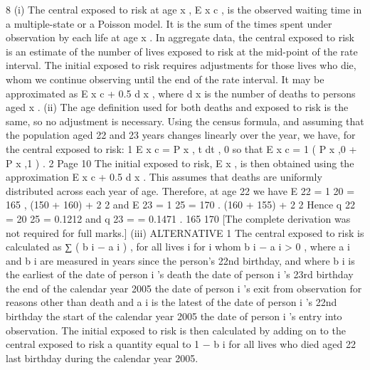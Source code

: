 \documentclass[a4paper,12pt]{article}
\begin{document}
\begin{enumerate}
8
(i)
The central exposed to risk at age x , E x c , is the observed waiting time in a multiple-state or a Poisson model. It is the sum of the times spent under
observation by each life at age x .
In aggregate data, the central exposed to risk is an estimate of the number of lives exposed to risk at the mid-point of the rate interval.
The initial exposed to risk requires adjustments for those lives who die, whom we continue observing until the end of the rate interval.
It may be approximated as E x c + 0.5 d x , where d x is the number of deaths to persons aged x .
(ii)
The age definition used for both deaths and exposed to risk is the same, so no adjustment is necessary.
Using the census formula, and assuming that the population aged 22 and 23 years changes linearly over the year, we have, for the central exposed to risk:
1
E x c = \int P x , t dt ,
0
so that
E x c =
1
( P x ,0 + P x ,1 ) .
2
Page 10%
The initial exposed to risk, E x , is then obtained using the approximation
E x c + 0.5 d x .
This assumes that deaths are uniformly distributed across each year of age.
Therefore, at age 22 we have
E 22 =
1
20
= 165 ,
(150 + 160) +
2
2
and
E 23 =
1
25
= 170 .
(160 + 155) +
2
2
Hence q 22 =
20
25
= 0.1212 and q 23 =
= 0.1471 .
165
170
[The complete derivation was not required for full marks.]
(iii)
ALTERNATIVE 1
The central exposed to risk is calculated as
∑ ( b i − a i ) , for all lives i for
i
whom b i − a i > 0 ,
where a i and b i are measured in years since the person’s 22nd birthday, and
where b i is the earliest of
the date of person i ’s death
the date of person i ’s 23rd birthday
the end of the calendar year 2005
the date of person i ’s exit from observation for reasons
other than death
and a i is the latest of
the date of person i ’s 22nd birthday
the start of the calendar year 2005
the date of person i ’s entry into observation.
The initial exposed to risk is then calculated by adding on to the central exposed to risk a quantity equal to 1 − b i for all lives who died aged 22 last
birthday during the calendar year 2005.


\end{enumerate}
\end{document}

